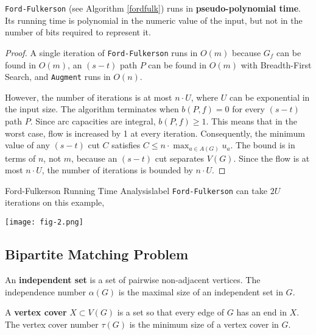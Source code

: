 	\begin{rmk}
		\texttt{Ford-Fulkerson} (see Algorithm \ref{fordfulk}) runs in \textbf{pseudo-polynomial time}. Its running time is polynomial in the numeric value of the input, but not in the number of bits required to represent it.
	\end{rmk}

	\begin{proof}
		A single iteration of \texttt{Ford-Fulkerson} runs in $O(m)$ because $G_f$ can be found in $O(m)$, an $(s-t)$ path $P$ can be found in $O(m)$ with Breadth-First Search, and \texttt{Augment} runs in $O(n)$.

		However, the number of iterations is at most $n \cdot U$, where $U$ can be exponential in the input size. The algorithm terminates when $b(P, f) = 0$ for every $(s-t)$ path $P$. Since arc capacities are integral, $b(P,f) \geq 1$. This means that in the worst case, flow is increased by 1 at every iteration. Consequently, the minimum value of any $(s-t)$ cut $C$ satisfies $C \leq n \cdot \max_{a \in A(G)} u_a$. The bound is in terms of $n$, not $m$, because an $(s-t)$ cut separates $V(G)$. Since the flow is at most $n \cdot U$, the number of iterations is bounded by $n \cdot U$.
	\end{proof}

	\begin{ex}{Ford-Fulkerson Running Time Analysis}{label}
		\texttt{Ford-Fulkerson} can take $2U$ iterations on this example,
		\begin{center}
		\texttt{[image: fig-2.png]}
		\end{center}
	\end{ex}

	\subsection{Bipartite Matching Problem}
	\begin{defn}
 		An \textbf{independent set} is a set of pairwise non-adjacent vertices. The independence number $\alpha(G)$ is the maximal size of an independent set in $G$.
	\end{defn}

	\begin{defn}
 		A \textbf{vertex cover} $X \subset V(G)$ is a set so that every edge of $G$ has an end in $X$. The vertex cover number $\tau(G)$ is the minimum size of a vertex cover in $G$.
	\end{defn}

